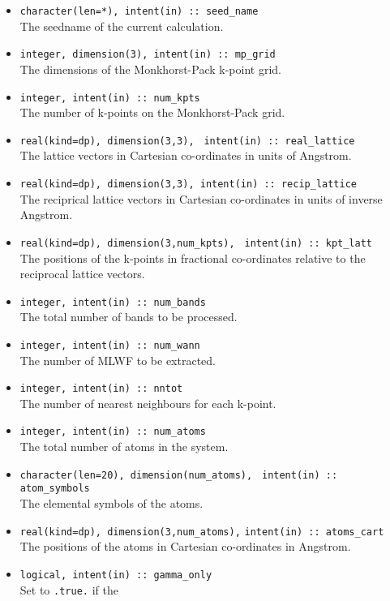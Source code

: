 \begin{itemize}
\item \verb#character(len=*), intent(in) :: seed_name#\\ The seedname
  of the current calculation.
\item \verb#integer, dimension(3), intent(in) :: mp_grid#\\ The
  dimensions of the {Monkhorst-Pack} k-point grid.
\item \verb#integer, intent(in) :: num_kpts#\\ The number of k-points on
  the {Monkhorst-Pack} grid.
\item \verb#real(kind=dp), dimension(3,3),#
      \verb# intent(in) :: real_lattice#\\ The lattice vectors in
      Cartesian co-ordinates in units of Angstrom. 
\item \verb#real(kind=dp), dimension(3,3), intent(in) :: recip_lattice#\\
  The reciprical lattice vectors in Cartesian co-ordinates in units of inverse Angstrom.
\item \verb#real(kind=dp), dimension(3,num_kpts),#
      \verb# intent(in) :: kpt_latt#\\ The positions of the k-points in
      fractional co-ordinates relative to the reciprocal lattice
      vectors.
\item \verb#integer, intent(in) :: num_bands#\\ The total number of
      bands to be processed.
\item \verb#integer, intent(in) :: num_wann#\\ The number of MLWF to
  be extracted. 
\item \verb#integer, intent(in) :: nntot#\\ The number of
  nearest neighbours for each k-point.
\item \verb#integer, intent(in) :: num_atoms#\\ The total number of atoms
  in the system.
\item \verb#character(len=20), dimension(num_atoms),#
      \verb# intent(in) :: atom_symbols#\\ The elemental symbols of
      the atoms.
\item \verb#real(kind=dp), dimension(3,num_atoms),#
      \verb#intent(in) :: atoms_cart#\\ The positions of the atoms in
      Cartesian co-ordinates in Angstrom.
\item \verb#logical, intent(in) :: gamma_only#\\ Set to \texttt{.true.} if the

\end{itemize}
